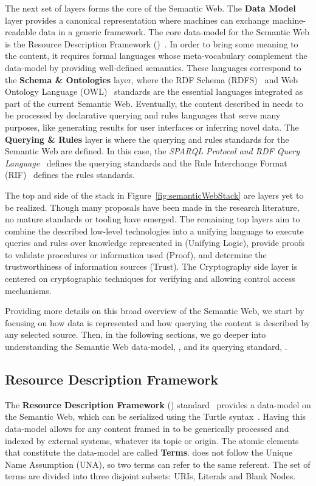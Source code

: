 The next set of layers forms the core of the Semantic Web. The \textbf{Data Model} layer 
provides a canonical representation where machines can exchange machine-readable data in 
a generic framework. The core data-model for the Semantic Web is the Resource Description 
Framework (\RDF{})~\cite{key:rdfprimer}. In order to bring some meaning to the \RDF{} content, 
it requires formal languages whose meta-vocabulary complement the \RDF{} data-model by providing 
well-defined semantics. These languages correspond to the \textbf{Schema \& Ontologies} layer, 
where the RDF Schema (RDFS)~\cite{key:oldrdf} and Web Ontology Language (OWL)~\cite{key:owloverview, key:owl2rationale} 
standards are the essential languages integrated as part of the current Semantic Web. 
Eventually, the content described in \RDF{} needs to be processed by declarative querying 
and rules languages that serve many purposes, like generating results for user interfaces 
or inferring novel \RDF{} data. The \textbf{Querying \& Rules} layer is where the querying 
and rules standards for the Semantic Web are defined. In this case, the \textit{SPARQL Protocol 
and RDF Query Language}~\cite{key:sparql,key:sparql11protocol,key:sparql11} 
defines the querying standards and the Rule Interchange Format (RIF)~\cite{key:rifframework} 
defines the rules standards.

The top and side of the stack in Figure~\ref{fig:semanticWebStack} are layers yet to be realized. Though many 
proposals have been made in the research literature, no mature standards or tooling have 
emerged. The remaining top layers aim to combine the described low-level technologies into 
a unifying language to execute queries and rules over knowledge represented in \RDF{} 
(Unifying Logic), provide proofs to validate procedures or information used (Proof), and 
determine the trustworthiness of information sources (Trust). The Cryptography side layer 
is centered on cryptographic techniques for verifying and allowing control access mechanisms.

Providing more details on this broad overview of the Semantic Web, we start by focusing on 
how data is represented and how querying the content is described by any selected source. 
Then, in the following sections, we go deeper into understanding the Semantic Web data-model, 
\RDF{}, and its querying standard, \SPARQL{}.

\subsection{Resource Description Framework}
\label{cap2:semWeb/rdf}
The \textbf{Resource Description Framework} (\RDF{}) standard~\cite{key:rdfprimer} provides 
a data-model on the Semantic Web, which can be serialized using the Turtle syntax~\cite{key:turtle}. 
Having this data-model allows for any content framed in \RDF{} to be generically processed 
and indexed by external systems, whatever its topic or origin. The atomic elements that 
constitute the \RDF{} data-model are called \textbf{\RDF{} Terms}. \RDF{} does not follow the Unique 
Name Assumption (UNA), so two \RDF{} terms can refer to the same referent. The set of \RDF{} terms 
are divided into three disjoint subsets: URIs, Literals and Blank Nodes.

